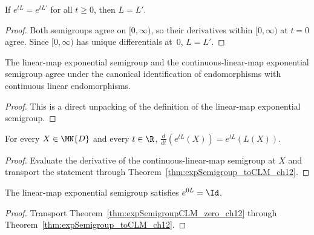 \begin{theorem}\label{thm:generator_unique_ch12}
    \leanok
    If $e^{tL} = e^{tL'}$ for all $t \ge 0$, then $L = L'$.
\end{theorem}

\begin{proof}
    \leanok
    Both semigroups agree on $[0,\infty)$, so their derivatives within
    $[0,\infty)$ at $t=0$ agree.
    Since $[0,\infty)$ has unique differentials at~$0$, $L = L'$.
\end{proof}

\begin{theorem}
    \label{thm:expSemigroup_toCLM_ch12}
    \leanok
    The linear-map exponential semigroup and the continuous-linear-map
    exponential semigroup agree under the canonical identification of
    endomorphisms with continuous linear endomorphisms.
\end{theorem}

\begin{proof}
    \leanok
    This is a direct unpacking of the definition of the linear-map
    exponential semigroup.
\end{proof}

\begin{theorem}
    \label{thm:hasDerivAt_expSemigroup_apply_ch12}
    \leanok
    For every $X \in \MN{D}$ and every $t \in \R$,
    $\frac{d}{dt}(e^{tL}(X)) = e^{tL}(L(X))$.
\end{theorem}

\begin{proof}
    \leanok
    Evaluate the derivative of the continuous-linear-map semigroup at $X$
    and transport the statement through
    Theorem~\ref{thm:expSemigroup_toCLM_ch12}.
\end{proof}

\begin{theorem}
    \label{thm:expSemigroup_zero_ch12}
    \leanok
    The linear-map exponential semigroup satisfies $e^{0L} = \Id$.
\end{theorem}

\begin{proof}
    \leanok
    Transport Theorem~\ref{thm:expSemigroupCLM_zero_ch12} through
    Theorem~\ref{thm:expSemigroup_toCLM_ch12}.
\end{proof}

